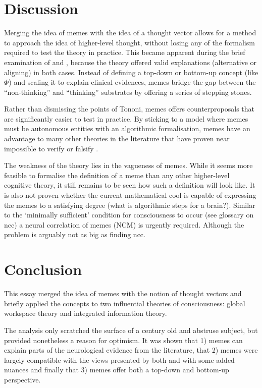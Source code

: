 \documentclass[a4paper,oneside]{memoir}
\begin{document}
\section{Discussion}
Merging the idea of memes with the idea of a thought vector allows for a method 
to approach the idea of higher-level thought, without losing any of the formalism required to
test the theory in practice. This became apparent during the brief examination of
\textcite{Tononi2004} and \textcite{baars2005}, because the theory offered valid
explanations (alternative or aligning) in both cases. Instead of defining a top-down 
or bottom-up concept (like $\Phi$) and scaling it to explain clinical evidences, memes
bridge the gap between the ``non-thinking'' and
``thinking'' substrates by offering a series of stepping stones. 

Rather than dismissing the points of Tononi, memes offers counterproposals that are
significantly easier to test in practice. By sticking to a model where memes
must be autonomous entities with an algorithmic formalisation, memes have an
advantage to many other theories in the literature that have proven near impossible
to verify or falsify \autocite{sep-consciousness}.

The weakness of the theory lies in the vagueness of memes. While it seems more feasible
to formalise the definition of a meme than any other higher-level cognitive theory,
it still remains to be seen how such a definition will look like. It is also not
proven whether the current mathematical cool is capable of expressing the memes to 
a satisfying degree (what is algorithmic steps for a brain?).
Similar to the `minimally
sufficient' condition for consciousness to occur (see glossary on \gls{ncc}) a neural
correlation of memes (NCM) is urgently required.
Although the problem is arguably not as big as finding \gls{ncc}.

\section{Conclusion}
This essay merged the idea of memes with the notion of thought vectors and briefly
applied the concepts to two influential theories of consciousness: global workspace
theory and integrated information theory.

The analysis only scratched the surface of a century old and abstruse subject, but
provided nonetheless a reason for optimism. It was shown that 1) memes can explain parts
of the neurological evidence from the literature, that 2) memes were largely compatible
with the views presented by both \textcite{baars2005} and \textcite{Tononi2004} with 
some added nuances
and finally that 3) memes offer both a \gls{top-down} and \gls{bottom-up} perspective.
\end{document}
